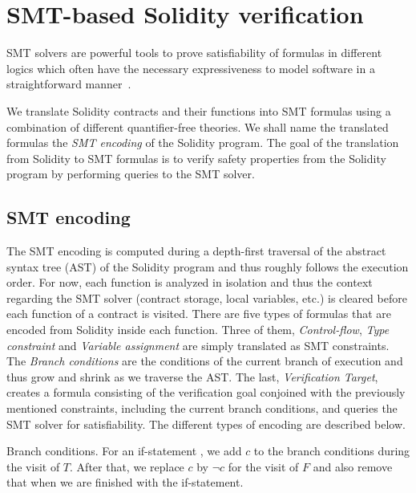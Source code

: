 \section{SMT-based Solidity verification}
\label{section:smt}

SMT solvers are powerful tools to prove satisfiability of formulas in different
logics which often have the necessary expressiveness to model software in a
straightforward manner~\cite{Komuravelli13,Alt17,Donaldson11,Beyer11}.

We translate Solidity contracts and their functions into SMT formulas using a
combination of different quantifier-free theories.
%
We shall name the translated formulas the \emph{SMT encoding} of the Solidity
program.
%
The goal of the translation from Solidity to SMT formulas is to verify safety
properties from the Solidity program by performing queries to the SMT solver.

\subsection{SMT encoding}

The SMT encoding is computed during a depth-first traversal of the
abstract syntax tree (AST) of the
Solidity program and thus roughly follows the execution order.
%
For now, each function is analyzed in isolation and thus the 
context regarding the SMT solver (contract storage, local variables, etc.)
is cleared before each function of a contract is visited.
%
There are five types of formulas that are encoded from Solidity inside each function.
%
Three of them, \emph{Control-flow}, \emph{Type constraint} and \emph{Variable assignment}
are simply translated as SMT constraints.
%
The \emph{Branch conditions} are the conditions of the current branch of
execution and thus grow and shrink as we traverse the AST.
%
The last, \emph{Verification Target}, creates a formula consisting of the
verification goal conjoined with the previously mentioned constraints,
including the current branch conditions, and
queries the SMT solver for satisfiability.
%
The different types of encoding are described below.

\begin{paragraph}{Branch conditions.}
For an if-statement , we add
$c$ to the branch conditions during the visit of $T$.
After that, we replace $c$ by $\neg c$
for the visit of $F$ and also remove that when we are
finished with the if-statement.
\end{paragraph}
  
